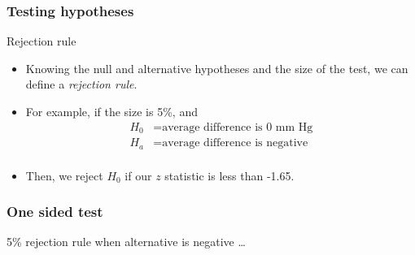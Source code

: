 \documentclass[handout]{beamer}
\begin{document}

   \begin{frame} \frametitle{Testing hypotheses}

   \begin{block}
   {Rejection rule}
   \begin{itemize}

   \item Knowing the null and alternative hypotheses and the size of the test,
   we can define a {\em \color{blue} rejection rule}.

   \item For example, if the size is 5\%, and
   $$
   \begin{aligned}
     H_0 &= \text{average difference is 0 mm Hg} \\
     H_a &= \text{average difference is negative} \\
   \end{aligned}
   $$
   \item Then, we reject $H_0$ if our $z$ statistic is
   less than {\color{blue} -1.65}.

   \end{itemize}
   \end{block}
   \end{frame}



   \begin{frame}
   \frametitle{One sided test}
   \begin{center}
   \end{center}
   {\color{blue} 5\% rejection rule} when alternative is negative \dots
   \end{frame}

\end{document}
